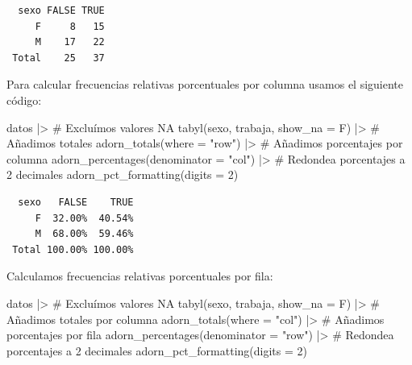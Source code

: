 \documentclass[
  spanish,
  a4paper,
]{scrbook}
\newenvironment{Shaded}{\begin{snugshade}}{\end{snugshade}}
\newcommand{\AttributeTok}[1]{\textcolor[rgb]{0.40,0.45,0.13}{#1}}
\newcommand{\CommentTok}[1]{\textcolor[rgb]{0.37,0.37,0.37}{#1}}
\newcommand{\DecValTok}[1]{\textcolor[rgb]{0.68,0.00,0.00}{#1}}
\newcommand{\FunctionTok}[1]{\textcolor[rgb]{0.28,0.35,0.67}{#1}}
\newcommand{\NormalTok}[1]{\textcolor[rgb]{0.00,0.23,0.31}{#1}}
\newcommand{\SpecialCharTok}[1]{\textcolor[rgb]{0.37,0.37,0.37}{#1}}
\newcommand{\StringTok}[1]{\textcolor[rgb]{0.13,0.47,0.30}{#1}}
\begin{document}
\begin{verbatim}
  sexo FALSE TRUE
     F     8   15
     M    17   22
 Total    25   37
\end{verbatim}

Para calcular frecuencias relativas porcentuales por columna usamos el
siguiente código:

\begin{Shaded}
\begin{Highlighting}[]
\NormalTok{datos }\SpecialCharTok{|\textgreater{}}
  \CommentTok{\# Excluímos valores NA}
  \FunctionTok{tabyl}\NormalTok{(sexo, trabaja, }\AttributeTok{show\_na =}\NormalTok{ F) }\SpecialCharTok{|\textgreater{}}
  \CommentTok{\# Añadimos totales}
  \FunctionTok{adorn\_totals}\NormalTok{(}\AttributeTok{where =} \StringTok{"row"}\NormalTok{) }\SpecialCharTok{|\textgreater{}}
  \CommentTok{\# Añadimos porcentajes por columna}
  \FunctionTok{adorn\_percentages}\NormalTok{(}\AttributeTok{denominator =} \StringTok{"col"}\NormalTok{) }\SpecialCharTok{|\textgreater{}}
  \CommentTok{\# Redondea porcentajes a 2 decimales}
  \FunctionTok{adorn\_pct\_formatting}\NormalTok{(}\AttributeTok{digits =} \DecValTok{2}\NormalTok{)}
\end{Highlighting}
\end{Shaded}

\begin{verbatim}
  sexo   FALSE    TRUE
     F  32.00%  40.54%
     M  68.00%  59.46%
 Total 100.00% 100.00%
\end{verbatim}

Calculamos frecuencias relativas porcentuales por fila:

\begin{Shaded}
\begin{Highlighting}[]
\NormalTok{datos }\SpecialCharTok{|\textgreater{}}
  \CommentTok{\# Excluímos valores NA}
  \FunctionTok{tabyl}\NormalTok{(sexo, trabaja, }\AttributeTok{show\_na =}\NormalTok{ F) }\SpecialCharTok{|\textgreater{}}
  \CommentTok{\# Añadimos totales por columna}
  \FunctionTok{adorn\_totals}\NormalTok{(}\AttributeTok{where =} \StringTok{"col"}\NormalTok{) }\SpecialCharTok{|\textgreater{}}
  \CommentTok{\# Añadimos porcentajes por fila}
  \FunctionTok{adorn\_percentages}\NormalTok{(}\AttributeTok{denominator =} \StringTok{"row"}\NormalTok{) }\SpecialCharTok{|\textgreater{}}
  \CommentTok{\# Redondea porcentajes a 2 decimales}
  \FunctionTok{adorn\_pct\_formatting}\NormalTok{(}\AttributeTok{digits =} \DecValTok{2}\NormalTok{)}
\end{Highlighting}
\end{Shaded}
\end{document}
